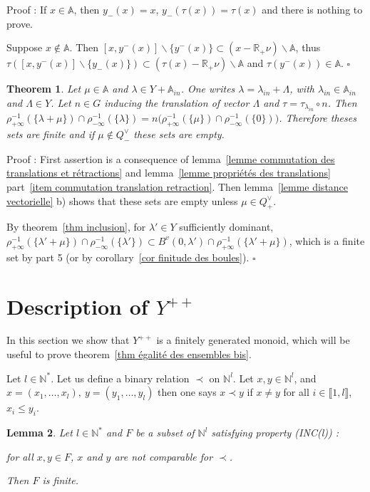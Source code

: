 \documentclass[12pt]{article}
\theoremstyle{plain}
\newtheorem{thm}{Theorem}[section] %
\newtheorem{lemme}[thm]{Lemma}
\theoremstyle{definition}
\newcommand{\R}{\mathbb{R}}
\newcommand{\A}{\mathbb{A}}
\newcommand{\N}{\mathbb{N}}
\newcommand{\Ne}{\mathbb{N}^*}
\begin{document}
Proof : If $x\in \mathbb{A}$, then $y_-(x)=x$, $y_-(\tau(x))=\tau(x)$ and there is nothing to prove. 

Suppose $x\notin \mathbb{A}$. 
Then $[x,y^-(x)]\backslash \{y^-(x)\}\subset (x-\R_+\nu)\backslash \mathbb{A}$,
 thus $\tau([x,y^-(x)]\backslash\{y_-(x)\})\subset (\tau(x)-\R_+\nu)\backslash \mathbb{A}$ and $\tau(y^-(x))\in \mathbb{A}$. $\square$
 




\begin{thm}\label{thm invariance des cardinaux}
Let $\mu\in \A$ and $\lambda\in Y+\A_{in}$. One writes $\lambda=\lambda_{in}+\Lambda$, with $\lambda_{in}\in\A_{in}$ and $\Lambda\in Y$. Let $n\in G$ inducing the translation of vector $\Lambda$ and $\tau=\tau_{\lambda_{in}}\circ n$. Then $\rho_{+\infty}^{-1}(\{\lambda+\mu\})\cap\rho_{-\infty}^{-1}(\{\lambda\})=n\big(\rho_{+\infty}^{-1}(\{\mu\})\cap\rho_{-\infty}^{-1}(\{0\})\big)$. Therefore theses sets are finite and if $\mu\notin Q^\vee_-$ these sets are empty.

\end{thm}

Proof : First assertion is a consequence of lemma~\ref{lemme commutation des translations et rétractions} and lemma~\ref{lemme propriétés des translations} part~\ref{item commutation translation retraction}. Then lemma~\ref{lemme distance vectorielle} b) shows that these sets are empty unless $\mu\in Q^\vee_+$. 

By theorem~\ref{thm inclusion}, for $\lambda'\in Y$ sufficiently dominant, $\rho_{+\infty}^{-1}(\{\lambda'+\mu\})\cap\rho_{-\infty}^{-1}(\{\lambda'\})\subset B^v(0,\lambda')\cap \rho_{+\infty}^{-1}(\{\lambda'+\mu\})$, which is a finite set by \cite{gaussent2014spherical} part 5 (or by corollary~\ref{cor finitude des boules}). $\square$








\section{Description of $Y^{++}$}\label{sect Y^++}

In this section we show that $Y^{++}$ is a finitely generated monoid, which will be useful to prove theorem~\ref{thm égalité des ensembles bis}.



Let $l\in \Ne$. Let us define a binary relation $\prec$ on $\N^l$. Let $x,y\in \N^l$,  and $x=(x_1,\ldots,x_l),\ y=(y_1,\ldots,y_l)$ then one says $x\prec y$ if $x\neq y$ 
 for all $i\in \llbracket 1,l\rrbracket$, $x_i\leq y_i$.
\begin{lemme}\label{lemme ensembles d'incomparables}
Let $l\in \Ne$ and $F$ be a subset of $\N^l$ satisfying property (INC(l)) : 

for all $x,y\in F$, $x$ and $y$ are not comparable for $\prec$. 

 Then $F$ is finite.
\end{lemme}
\end{document}
